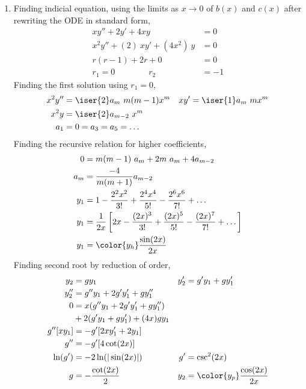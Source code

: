 \begin{enumerate}
    \item Finding indicial equation, using the limits as $ x \rightarrow 0 $
          of $ b(x) $ and $ c(x) $ after rewriting the ODE in standard form,
          \begin{align}
              xy'' + 2y' + 4xy              & = 0  \\
              x^2y'' + (2)\ xy' + (4x^2)\ y & = 0  \\
              r(r-1) + 2r + 0               & = 0  \\
              r_1 = 0 \qquad\qquad r_2      & = -1
          \end{align}
          Finding the first solution using $ r_1 = 0 $,
          \begin{align}
              x^2y'' & = \iser{2}a_m\ m(m-1)x^m &
              xy'    & = \iser{1}a_m\ m x^m       \\
              x^2y   & = \iser{2}a_{m-2}\ x^{m}   \\
              a_1    & = 0 = a_3 = a_5 = \dots
          \end{align}
          Finding the recursive relation for higher coefficients,
          \begin{align}
              0   & = m(m-1)\ a_m + 2m\ a_m + 4a_{m-2}                \\
              a_m & = \frac{-4}{m(m+1)}a_{m-2}                        \\
              y_1 & =  1 - \frac{2^2x^2}{3!} + \frac{2^4 x^4}{5!}
              - \frac{2^6 x^6}{7!} + \dots                            \\
              y_1 & = \frac{1}{2x}\left[ 2x - \frac{(2x)^3}{3!}
              + \frac{(2x)^5}{5!} - \frac{(2x)^7}{7!} + \dots \right] \\
              y_1 & = \color{y_h} \frac{\sin(2x)}{2x}
          \end{align}
          Finding second root by reduction of order,
          \begin{align}
              y_2       & = gy_1                            &
              y_2'      & = g'y_1 + gy_1'                     \\
              y_2''     & = g''y_1 + 2g'y_1' + gy_1''         \\
              0         & = x(g''y_1 + 2g'y_1' + gy_1'')      \\
                        & + 2(g'y_1 + gy_1') + (4x)gy_1       \\
              g''[xy_1] & = -g' [2xy_1' + 2y_1]               \\
              g''       & = -g' [4\cot(2x)]                   \\
              \ln(g')   & = -2\ln(|\sin(2x)|)               &
              g'        & = \csc^{2}(2x)                      \\
              g         & = -\frac{\cot(2x)}{2}             &
              y_2       & = \color{y_p} \frac{\cos(2x)}{2x}
          \end{align}


\end{enumerate}
